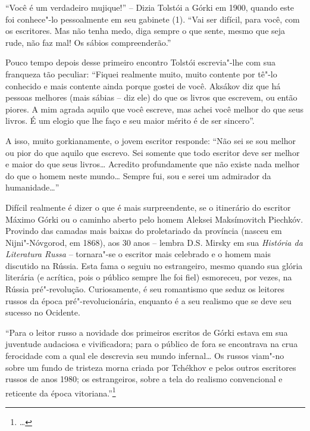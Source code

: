 ``Você é um verdadeiro mujique!'' -- Dizia Tolstói a Górki em 1900,
quando este foi conhece"-lo pessoalmente em seu gabinete (1). ``Vai ser
difícil, para você, com os escritores. Mas não tenha medo, diga sempre o
que sente, mesmo que seja rude, não faz mal! Os sábios compreenderão.''

Pouco tempo depois desse primeiro encontro Tolstói escrevia"-lhe com sua
franqueza tão peculiar: ``Fiquei realmente muito, muito contente por
tê"-lo conhecido e mais contente ainda porque gostei de você. Aksákov diz
que há pessoas melhores (mais sábias -- diz ele) do que os livros que
escrevem, ou então piores. A mim agrada aquilo que você escreve, mas
achei você melhor do que seus livros. É um elogio que lhe faço e seu
maior mérito é de ser sincero''.

A isso, muito gorkianamente, o jovem escritor responde: ``Não sei se sou
melhor ou pior do que aquilo que escrevo. Sei somente que todo escritor
deve ser melhor e maior do que seus livros\ldots{} Acredito profundamente que
não existe nada melhor do que o homem neste mundo\ldots{} Sempre fui, sou e
serei um admirador da humanidade\ldots{}''

Difícil realmente é dizer o que é mais surpreendente, se o itinerário do
escritor Máximo Górki ou o caminho aberto pelo homem Aleksei
Maksímovitch Piechkóv. Provindo das camadas mais baixas do proletariado
da província (nasceu em Nijni"-Nóvgorod, em 1868), aos 30 anos -- lembra
D.S. Mirsky em sua \emph{História da Literatura Russa} -- tornara"-se o
escritor mais celebrado e o homem mais discutido na Rússia. Esta fama
o seguiu no estrangeiro, mesmo quando sua glória literária (e
acrítica, pois o público sempre lhe foi fiel) esmoreceu, por vezes, na
Rússia pré"-revolução. Curiosamente, é seu romantismo que seduz os
leitores russos da época pré"-revolucionária, enquanto é a seu realismo
que se deve seu sucesso no Ocidente.

``Para o leitor russo a novidade dos primeiros escritos de Górki estava
em sua juventude audaciosa e vivificadora; para o público de fora se
encontrava na crua ferocidade com a qual ele descrevia seu mundo
infernal\ldots{} Os russos viam"-no sobre um fundo de tristeza morna criada
por Tchékhov e pelos outros escritores russos de anos 1980; os
estrangeiros, sobre a tela do realismo convencional e reticente da época
vitoriana.''\footnote{\ldots{}}

